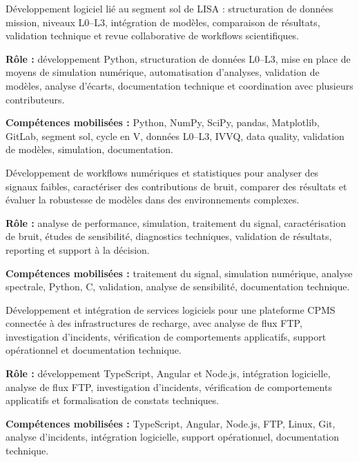 \documentclass[8pt,a4paper,ragged2e,withhyper]{altacv}
\begin{document}
Développement logiciel lié au segment sol de LISA : structuration de données mission, niveaux L0--L3, intégration de modèles, comparaison de résultats, validation technique et revue collaborative de workflows scientifiques.

\textbf{Rôle :} développement Python, structuration de données L0--L3, mise en place de moyens de simulation numérique, automatisation d’analyses, validation de modèles, analyse d’écarts, documentation technique et coordination avec plusieurs contributeurs.

\textbf{Compétences mobilisées :} Python, NumPy, SciPy, pandas, Matplotlib, GitLab, segment sol, cycle en V, données L0--L3, IVVQ, data quality, validation de modèles, simulation, documentation.

\divider


Développement de workflows numériques et statistiques pour analyser des signaux faibles, caractériser des contributions de bruit, comparer des résultats et évaluer la robustesse de modèles dans des environnements complexes.

\textbf{Rôle :} analyse de performance, simulation, traitement du signal, caractérisation de bruit, études de sensibilité, diagnostics techniques, validation de résultats, reporting et support à la décision.

\textbf{Compétences mobilisées :} traitement du signal, simulation numérique, analyse spectrale, Python, C, validation, analyse de sensibilité, documentation technique.

\divider


Développement et intégration de services logiciels pour une plateforme CPMS connectée à des infrastructures de recharge, avec analyse de flux FTP, investigation d’incidents, vérification de comportements applicatifs, support opérationnel et documentation technique.

\textbf{Rôle :} développement TypeScript, Angular et Node.js, intégration logicielle, analyse de flux FTP, investigation d’incidents, vérification de comportements applicatifs et formalisation de constats techniques.

\textbf{Compétences mobilisées :} TypeScript, Angular, Node.js, FTP, Linux, Git, analyse d’incidents, intégration logicielle, support opérationnel, documentation technique.
\end{document}
